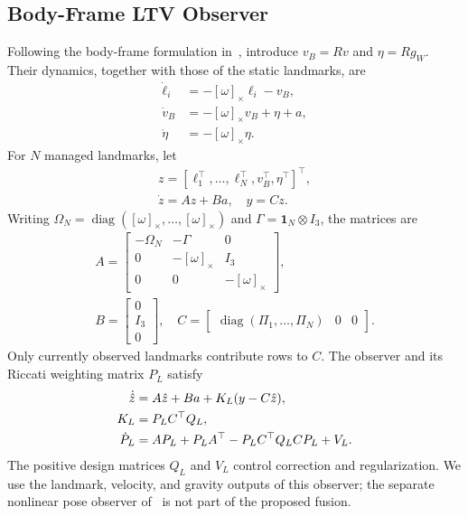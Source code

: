 \documentclass[a4paper,runningheads,twocolumn]{llncs}
\newcommand{\sk}[1]{[#1]_{\times}}
\newcommand{\diag}{\operatorname{diag}}
\begin{document}
\subsection{Body-Frame LTV Observer}
Following the body-frame formulation in~\cite{wang2024}, introduce $v_B=Rv$ and $\eta=Rg_W$. Their dynamics, together with those of the static landmarks, are
\begin{equation}
 \begin{aligned}
 \dot\ell_i&=-\sk{\omega}\ell_i-v_B,\\
 \dot v_B&=-\sk{\omega}v_B+\eta+a,\\
 \dot\eta&=-\sk{\omega}\eta .
 \end{aligned}
 \label{eq:ltvdynamics}
\end{equation}
For $N$ managed landmarks, let
\begin{equation}
 \begin{gathered}
 z=[\ell_1^\top,\ldots,\ell_N^\top,v_B^\top,\eta^\top]^\top,\\
 \dot z=Az+Ba,\quad y=Cz .
 \end{gathered}
 \label{eq:ltvstate}
\end{equation}
Writing $\Omega_N=\diag(\sk{\omega},\ldots,\sk{\omega})$ and
$\Gamma=\bm{1}_N\otimes I_3$, the matrices are
\begin{equation}
 \begin{gathered}
 A=\begin{bmatrix}
 -\Omega_N&-\Gamma&0\\
 0&-\sk{\omega}&I_3\\
 0&0&-\sk{\omega}
 \end{bmatrix},\\
 B=\begin{bmatrix}0\\I_3\\0\end{bmatrix},\quad
 C=\begin{bmatrix}\diag(\Pi_1,\ldots,\Pi_N)&0&0\end{bmatrix}.
 \end{gathered}
 \label{eq:ltvmatrices}
\end{equation}
Only currently observed landmarks contribute rows to $C$. The observer and its Riccati weighting matrix $P_L$ satisfy
\begin{align}
 \dot{\hat z}&=A\hat z+Ba+K_L(y-C\hat z),\label{eq:observer}\\
 K_L&=P_LC^\top Q_L, \notag\\
 \dot P_L&=AP_L+P_LA^\top-P_LC^\top Q_LCP_L+V_L .
 \label{eq:riccati}
\end{align}
The positive design matrices $Q_L$ and $V_L$ control correction and regularization. We use the landmark, velocity, and gravity outputs of this observer; the separate nonlinear pose observer of~\cite{wang2024} is not part of the proposed fusion.
\end{document}
